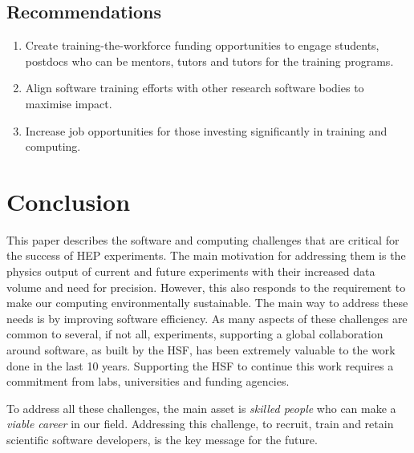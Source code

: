 \documentclass[10pt,a4paper]{article}
\begin{document}
\subsection{Recommendations}\label{recommendations-4}

\begin{enumerate}
\def\labelenumi{\arabic{enumi}.}
\item
  Create training-the-workforce funding opportunities to engage
  students, postdocs who can be mentors, tutors and tutors for the
  training programs.
\item
  Align software training efforts with other research software bodies to
  maximise impact.
\item
  Increase job opportunities for those investing significantly in
  training and computing.
\end{enumerate}

\section{Conclusion}\label{conclusion}

This paper describes the software and computing challenges that are
critical for the success of HEP experiments. The main motivation for
addressing them is the physics output of current and future experiments
with their increased data volume and need for precision. However, this
also responds to the requirement to make our computing environmentally
sustainable. The main way to address these needs is by improving
software efficiency. As many aspects of these challenges are common to
several, if not all, experiments, supporting a global collaboration
around software, as built by the HSF, has been extremely valuable to the
work done in the last 10 years. Supporting the HSF to continue this work
requires a commitment from labs, universities and funding agencies.

To address all these challenges, the main asset is \emph{skilled people}
who can make a \emph{viable career} in our field. Addressing this
challenge, to recruit, train and retain scientific software developers,
is the key message for the future.

\sloppy
\printbibliography
\end{document}
